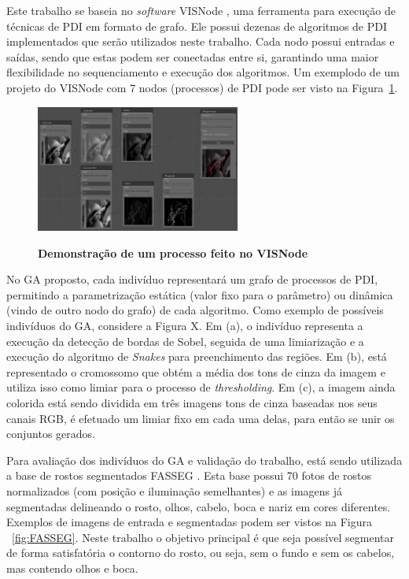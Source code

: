 \documentclass[12pt,oneside,a4paper,english,french,spanish,brazil,]{abntex2}
\begin{document}
Este trabalho se baseia no \textit{software} VISNode \cite{visnode:2018}, uma ferramenta para execução de técnicas de PDI em formato de grafo. Ele possui dezenas de algoritmos de PDI implementados que serão utilizados neste trabalho. Cada nodo possui entradas e saídas, sendo que estas podem ser conectadas entre si, garantindo uma maior flexibilidade no sequenciamento e execução dos algoritmos. Um exemplodo de um projeto do VISNode com 7 nodos (processos) de PDI pode ser visto na Figura~\ref{fig:PRO_Visnode}.

\begin{figure}[ht]
\centering
\caption{\textbf{Demonstração de um processo feito no VISNode}}
\includegraphics[width=0.6\textwidth]{imagens/PRO_Visnode.PNG}
\label{fig:PRO_Visnode}
\end{figure}

No GA proposto, cada indivíduo representará um grafo de processos de PDI, permitindo a parametrização estática (valor fixo para o parâmetro) ou dinâmica (vindo de outro nodo do grafo) de cada algoritmo. Como exemplo de possíveis indivíduos do GA, considere a Figura X. Em (a), o indivíduo representa a execução da detecção de bordas de Sobel, seguida de uma limiarização e a execução do algoritmo de \textit{Snakes} para preenchimento das regiões. Em (b), está representado o cromossomo que obtém a média dos tons de cinza da imagem e utiliza isso como limiar para o processo de \textit{thresholding}. Em (c), a imagem ainda colorida está sendo dividida em três imagens tons de cinza baseadas nos seus canais RGB, é efetuado um limiar fixo em cada uma delas, para então se unir os conjuntos gerados.

Para avaliação dos indivíduos do GA e validação do trabalho, está sendo utilizada a base de rostos segmentados FASSEG \cite{fasseg:2018}. Esta base possui 70 fotos de rostos normalizados (com posição e iluminação semelhantes) e as imagens já segmentadas delineando o rosto, olhos, cabelo, boca e nariz em cores diferentes. Exemplos de imagens de entrada e segmentadas podem ser vistos na Figura ~\ref{fig:FASSEG}. Neste trabalho o objetivo principal é que seja possível segmentar de forma satisfatória o contorno do rosto, ou seja, sem o fundo e sem os cabelos, mas contendo olhos e boca.
\end{document}

